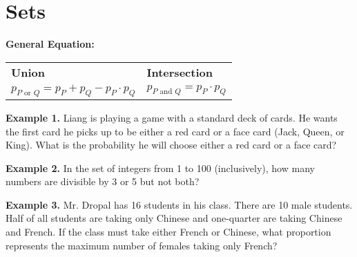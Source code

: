 \section{Sets}

\bigskip
\textbf{General Equation:}

\begin{tabularx}{\textwidth}{*2{@{}>{\centering\arraybackslash}X}}
\textbf{\large Union} & \textbf{\large Intersection}\\
$p_{P\mbox{ or }Q} = p_P+p_Q-p_P\cdot p_Q$ & $p_{P\mbox{ and }Q} = p_P\cdot p_Q$
\end{tabularx}

\vfill
\textbf{Example 1.} Liang is playing a game with a standard deck of cards. He wants the first card he picks up to be either a red card or a face card (Jack, Queen, or King). What is the probability he will choose either a red card or a face card?

\vfill
\textbf{Example 2.} In the set of integers from 1 to 100 (inclusively), how many numbers are divisible by 3 or 5 but not both?

\vfill
\textbf{Example 3.} Mr. Dropal has 16 students in his class. There are 10 male students. Half of all students are taking only Chinese and one-quarter are taking Chinese and French. If the class must take either French or Chinese, what proportion represents the maximum number of females taking only French?

